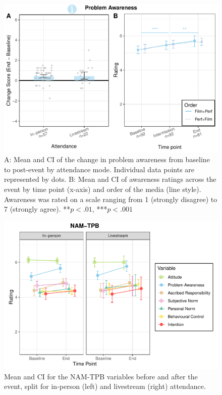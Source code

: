 \documentclass[
  man,floatsintext]{apa6}
\begin{document}
\begin{figure}
\includegraphics[width=1\linewidth]{Schlichting_MSc_Thesis_files/figure-latex/awareness-plots-1} \caption{A: Mean and CI of the change in problem awareness from baseline to post-event by attendance mode. Individual data points are represented by dots. B: Mean and CI of awareness ratings across the event by time point (x-axis) and order of the media (line style). Awareness was rated on a scale ranging from 1 (strongly disagree) to 7 (strongly agree). **\(p < .01\), ***\(p < .001\)}\label{fig:awareness-plots}
\end{figure}



\begin{figure}
\includegraphics[width=1\linewidth]{Schlichting_MSc_Thesis_files/figure-latex/namtpb-lineplots-1} \caption{Mean and CI for the NAM-TPB variables before and after the event, split for in-person (left) and livestream (right) attendance.}\label{fig:namtpb-lineplots}
\end{figure}
\end{document}
